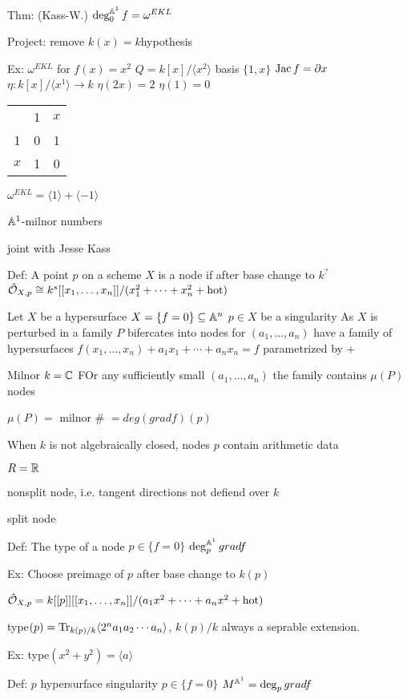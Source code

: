 Thm: (Kass-W.)
$\deg_0^{\mathbb{A}^1} f= \omega^{EKL}$

Project: remove $k(x)=k $hypothesis

Ex: $\omega^{EKL}$ for $f(x)=x^2$
$Q= k[x]/\langle x^2 \rangle$ basis $\{1,x\}$
$\operatorname{Jac} f= \partial x$
$\eta: k[x]/\langle x^1 \rangle \to k$
$\eta(2x)=2$
$\eta(1)=0$

\begin{tabular}{ccc}
& 1 & $x$ \\
1 & 0 & 1 \\
$x$ & 1 & 0 
\end{tabular}


$\omega^{EKL}= \langle 1 \rangle + \langle -1 \rangle$ 


$\mathbb{A}^1$-milnor numbers

joint with Jesse Kass

Def: A point $p$ on a scheme $X$ is a node if after base change to $k^?$
$\hat{\mathcal{O}}_{X,p} \cong k^s[[x_1,\ldots,x_n]]/(x_1^2+\cdots+x_n^2+ \text{hot})$

Let $X$ be a hypersurface $X= \{f=0\} \subseteq \mathbb{A}^n$
$p \in X$ be a singularity
As $X$ is perturbed in a family $P$ bifercates into nodes for $(a_1,\ldots,a_n)$ have a family of hypersurfaces $f(x_1,\ldots,x_n) + a_1x_1+\cdots+a_nx_n= f$ parametrized by $+$


Milnor
$k= \mathbb{C}$
FOr any sufficiently small $(a_1,\ldots,a_n)$ the family contains $\mu(P)$ nodes

$\mu(P)=$ milnor \# $= deg (grad f)(p)$

When $k$ is not algebraically closed, nodes $p$ contain arithmetic data

$R= \mathbb{R}$

nonsplit node, i.e. tangent directions not defiend over $k$

split node


Def: The type of a node $p \in \{f=0\}$
$\deg_p^{\mathbb{A}^1} grad f$

Ex: Choose preimage of $p$ after base change to $k(p)$

$\hat{\mathcal{O}}_{X,p}= k[[p]][[x_1,\ldots,x_n]]/(a_1x^2+\cdots+a_nx^2+ \text{hot})$

type$(p)= \operatorname{Tr}_{k(p)/k} \langle 2^na_1a_2\cdots a_n \rangle$, $k(p)/k$ always a seprable extension. 



Ex: type$(x^2+y^2)= \langle a \rangle$

Def: $p$ hypersurface singularity $p \in \{f=0\}$
$M^{\mathbb{A}^1}= \deg_p grad f$

